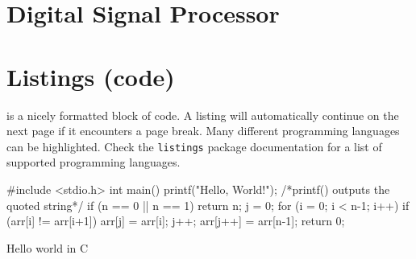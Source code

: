 \section{Digital Signal Processor}

\section{Listings (code)}

 is a nicely formatted block of code. A listing will automatically continue on the next page if it encounters a page break. Many different programming languages can be highlighted. Check the \texttt{listings} package documentation for a list of supported programming languages.

\begin{listing}[htbp]
\begin{mintedc}
#include <stdio.h>
int main()
{
	printf("Hello, World!"); /*printf() outputs the quoted string*/
	if (n == 0 || n == 1){
		return n;
	}
	j = 0;
	for (i = 0; i < n-1; i++){
		if (arr[i] != arr[i+1]){
			arr[j] = arr[i];
			j++;
		}
	}
	arr[j++] = arr[n-1];
	return 0;
}
\end{mintedc}
	\caption{Hello world in C}
	\label{lst:helloworld}
\end{listing}



